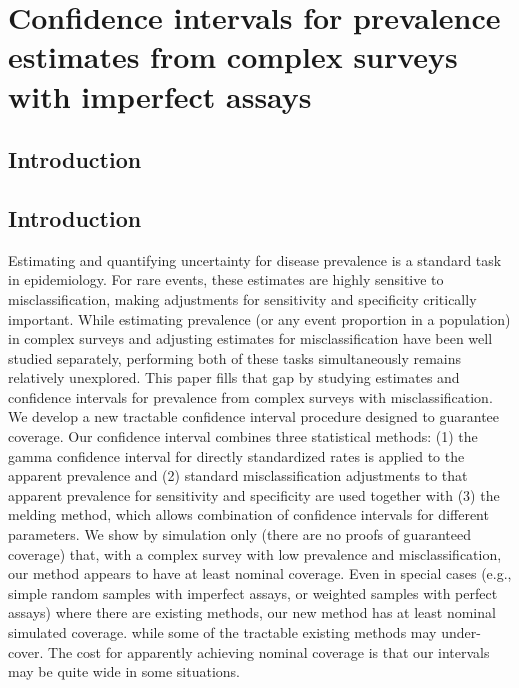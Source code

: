 \chapter{Confidence intervals for prevalence estimates from complex surveys with imperfect assays}
\label{ch:content_1}
\section{Introduction}

\section{Introduction}

Estimating and quantifying uncertainty for disease prevalence is a standard task in epidemiology.
For rare events, these estimates are highly sensitive to misclassification,\cite{hemenwaySelfDefense} making adjustments for sensitivity and specificity critically important.
While estimating prevalence (or any event proportion in a population) in complex surveys and adjusting estimates for misclassification have been well studied separately, performing both of these tasks simultaneously remains relatively unexplored. This paper fills that gap by studying estimates and confidence intervals for prevalence from complex surveys with misclassification.
We develop a new tractable confidence interval procedure designed to guarantee coverage.
Our confidence interval combines three statistical methods: (1) the gamma confidence interval for directly standardized rates is applied to the apparent prevalence\cite{FayF:1997}
and (2) standard misclassification adjustments to that apparent prevalence for sensitivity and specificity \cite{Roga:1978} are used together with (3) the melding method, which allows combination of confidence intervals for different parameters.\cite{FayP:2015}
We show by simulation only (there are no proofs of guaranteed coverage) that, with a complex survey with low prevalence and misclassification, our method appears to have at least nominal coverage.
Even in special cases (e.g., simple random samples with imperfect assays, or weighted samples with perfect assays) where there are existing methods, our new method has at least nominal simulated coverage. while some of the tractable existing methods may under-cover.
The cost for apparently achieving nominal coverage is that our intervals may be quite wide in some situations.


